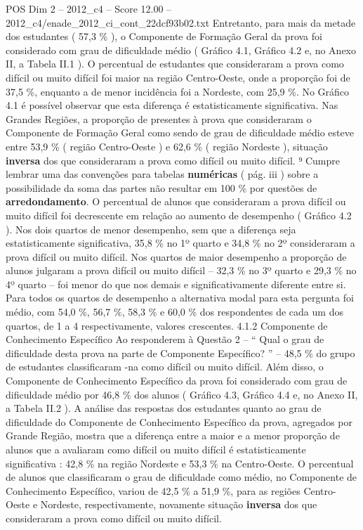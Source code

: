 \begin{textsample}{POS Dim 2 – 2012\_c4 – Score 12.00 – 2012\_c4/enade\_2012\_ci\_cont\_22dcf93b02.txt}
Entretanto, para mais da metade dos estudantes ( 57,3 \% ), o Componente de Formação Geral da prova foi considerado com grau de dificuldade médio ( Gráfico 4.1, Gráfico 4.2 e, no Anexo II, a Tabela II.1 ).
O percentual de estudantes que consideraram a prova como difícil ou muito difícil foi maior na região Centro-Oeste, onde a proporção foi de 37,5 \%, enquanto a de menor incidência foi a Nordeste, com 25,9 \%.
No Gráfico 4.1 é possível observar que esta diferença é estatisticamente significativa.
Nas Grandes Regiões, a proporção de presentes à prova que consideraram o Componente de Formação Geral como sendo de grau de dificuldade médio esteve entre 53,9 \% ( região Centro-Oeste ) e 62,6 \% ( região Nordeste ), situação \textbf{inversa} dos que consideraram a prova como difícil ou muito difícil. ⁹ Cumpre lembrar uma das convenções para tabelas \textbf{numéricas} ( pág. iii ) sobre a possibilidade da soma das partes não resultar em 100 \% por questões de \textbf{arredondamento}.
O percentual de alunos que consideraram a prova difícil ou muito difícil foi decrescente em relação ao aumento de desempenho ( Gráfico 4.2 ).
Nos dois quartos de menor desempenho, sem que a diferença seja estatisticamente significativa, 35,8 \% no 1º quarto e 34,8 \% no 2º consideraram a prova difícil ou muito difícil.
Nos quartos de maior desempenho a proporção de alunos julgaram a prova difícil ou muito difícil – 32,3 \% no 3º quarto e 29,3 \% no 4º quarto – foi menor do que nos demais e significativamente diferente entre si.
Para todos os quartos de desempenho a alternativa modal para esta pergunta foi médio, com 54,0 \%, 56,7 \%, 58,3 \% e 60,0 \% dos respondentes de cada um dos quartos, de 1 a 4 respectivamente, valores crescentes. 4.1.2 Componente de Conhecimento Específico Ao responderem à Questão 2 – “ Qual o grau de dificuldade desta prova na parte de Componente Específico? ” – 48,5 \% do grupo de estudantes classificaram -na como difícil ou muito difícil.
Além disso, o Componente de Conhecimento Específico da prova foi considerado com grau de dificuldade médio por 46,8 \% dos alunos ( Gráfico 4.3, Gráfico 4.4 e, no Anexo II, a Tabela II.2 ).
A análise das respostas dos estudantes quanto ao grau de dificuldade do Componente de Conhecimento Específico da prova, agregados por Grande Região, mostra que a diferença entre a maior e a menor proporção de alunos que a avaliaram como difícil ou muito difícil é estatisticamente significativa : 42,8 \% na região Nordeste e 53,3 \% na Centro-Oeste.
O percentual de alunos que classificaram o grau de dificuldade como médio, no Componente de Conhecimento Específico, variou de 42,5 \% a 51,9 \%, para as regiões Centro-Oeste e Nordeste, respectivamente, novamente situação \textbf{inversa} dos que consideraram a prova como difícil ou muito difícil.

\end{textsample}
